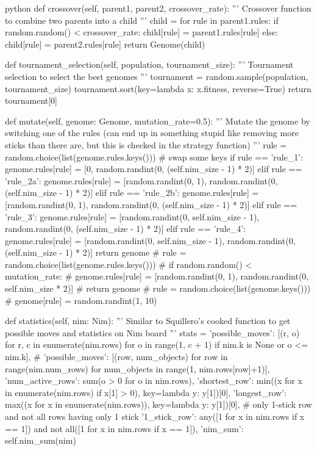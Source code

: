 \begin{mintedbox}{python}
    def crossover(self, parent1, parent2, crossover_rate):
        '''
        Crossover function to combine two parents into a child
        '''
        child = {}
        for rule in parent1.rules:
            if random.random() < crossover_rate:
                child[rule] = parent1.rules[rule]
            else:
                child[rule] = parent2.rules[rule]
        return Genome(child)

    def tournament_selection(self, population, tournament_size):
        '''
        Tournament selection to select the best genomes
        '''
        tournament = random.sample(population, tournament_size)
        tournament.sort(key=lambda x: x.fitness, reverse=True)
        return tournament[0]

    def mutate(self, genome: Genome, mutation_rate=0.5):
        '''
        Mutate the genome by switching one of the rules (can end up in something stupid like removing more sticks than there are, but this is checked in the strategy function)
        '''
        rule = random.choice(list(genome.rules.keys()))
        # swap some keys
        if rule == 'rule_1':
            genome.rules[rule] = [0, random.randint(0, (self.nim_size - 1) * 2)]
        elif rule == 'rule_2a':
            genome.rules[rule] = [random.randint(0, 1), random.randint(0, (self.nim_size - 1) * 2)]
        elif rule == 'rule_2b':
            genome.rules[rule] = [random.randint(0, 1), random.randint(0, (self.nim_size - 1) * 2)]
        elif rule == 'rule_3':
            genome.rules[rule] = [random.randint(0, self.nim_size - 1), random.randint(0, (self.nim_size - 1) * 2)]
        elif rule == 'rule_4':
            genome.rules[rule] = [random.randint(0, self.nim_size - 1), random.randint(0, (self.nim_size - 1) * 2)]
        return genome
        # rule = random.choice(list(genome.rules.keys()))
        # if random.random() < mutation_rate:
        #     genome.rules[rule] = [random.randint(0, 1), random.randint(0, self.nim_size * 2)]
        # return genome
        # rule = random.choice(list(genome.keys()))
        # genome[rule] = random.randint(1, 10)

    def statistics(self, nim: Nim):
        '''
        Similar to Squillero's cooked function to get possible moves
        and statistics on Nim board
        '''
        stats = {
            'possible_moves': [(r, o) for r, c in enumerate(nim.rows) for o in range(1, c + 1) if nim.k is None or o <= nim.k],
            # 'possible_moves': [(row, num_objects) for row in range(nim.num_rows) for num_objects in range(1, nim.rows[row]+1)],
            'num_active_rows': sum(o > 0 for o in nim.rows),
            'shortest_row': min((x for x in enumerate(nim.rows) if x[1] > 0), key=lambda y: y[1])[0],
            'longest_row': max((x for x in enumerate(nim.rows)), key=lambda y: y[1])[0],
            # only 1-stick row and not all rows having only 1 stick
            '1_stick_row': any([1 for x in nim.rows if x == 1]) and not all([1 for x in nim.rows if x == 1]),
            'nim_sum': self.nim_sum(nim)
        }


\end{mintedbox}
